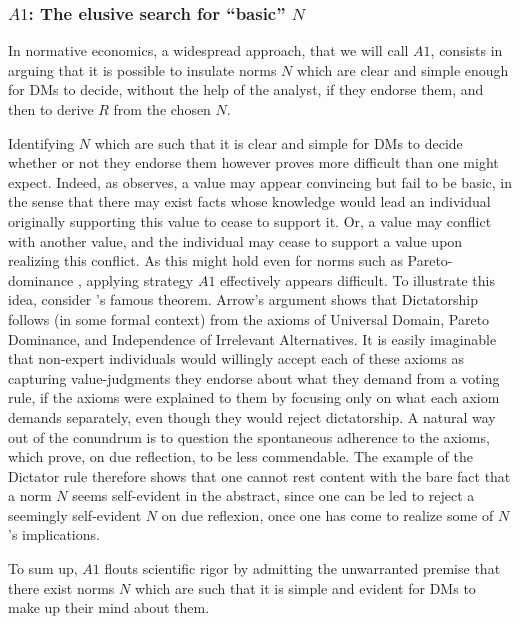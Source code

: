 \documentclass[preprint, french, english, 11pt, authoryear]{elsarticle}%
\newcommand{\protectforpdf}[1]{\texorpdfstring{\ensuremath{#1}}{#1}}
\begin{document}
\subsubsection{\protectforpdf{A1}: The elusive search for ``basic'' \protectforpdf{N}}

In normative economics, a widespread approach, that we will call $A1$, consists in arguing that it is possible to insulate norms $N$ which are clear and simple enough for \acp{DM} to decide, without the help of the analyst, if they endorse them, and then to derive $R$ from the chosen $N$.

Identifying $N$ which are such that it is clear and simple for \acp{DM} to decide whether or not they endorse them however proves more difficult than one might expect. Indeed, as \citet{sen_nature_1967} observes, a value may appear convincing but fail to be basic, in the sense that there may exist facts whose knowledge would lead an individual originally supporting this value to cease to support it. Or, a value may conflict with another value, and the individual may cease to support a value upon realizing this conflict. As this might hold even for norms such as Pareto-dominance \citep[ch. 5 and 6]{sen_collective_1984}, applying strategy $A1$ effectively appears difficult. To illustrate this idea, consider \citeauthor{arrow_social_2012}’s \citeyearpar{arrow_social_2012} famous theorem. Arrow's argument shows that Dictatorship follows (in some formal context) from the axioms of Universal Domain, Pareto Dominance, and Independence of Irrelevant Alternatives. It is easily imaginable that non-expert individuals would willingly accept each of these axioms as capturing value-judgments they endorse about what they demand from a voting rule, if the axioms were explained to them by focusing only on what each axiom demands separately, even though they would reject dictatorship. A natural way out of the conundrum is to question the spontaneous adherence to the axioms, which prove, on due reflection, to be less commendable. The example of the Dictator rule therefore shows that one cannot rest content with the bare fact that a norm $N$ seems self-evident in the abstract, since one can be led to reject a seemingly self-evident $N$ on due reflexion, once one has come to realize some of $N$'s implications.

To sum up, $A1$ flouts scientific rigor by admitting the unwarranted premise that there exist norms $N$ which are such that it is simple and evident for \acp{DM} to make up their mind about them.
\end{document}
